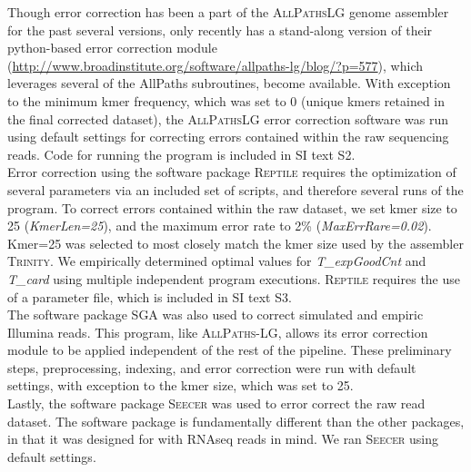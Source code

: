 \documentclass[11pt]{article}
\begin{document}
\noindent
Though error correction has been a part of the \textsc{AllPathsLG} genome assembler for the past several versions, only recently has a stand-along version of their python-based error correction module (\url{http://www.broadinstitute.org/software/allpaths-lg/blog/?p=577}), which leverages several of the AllPaths subroutines, become available.  With exception to the minimum kmer frequency, which was set to 0 (unique kmers retained in the final corrected dataset), the \textsc{AllPathsLG} error correction software was run using default settings for correcting errors contained within the raw sequencing reads.  Code for running the program is included in SI text S2.   \\

\noindent
Error correction using the software package \textsc{Reptile} requires the optimization of several parameters via an included set of scripts, and therefore several runs of the program. To correct errors contained within the raw dataset, we set kmer size to 25 (\textit{KmerLen=25}), and the maximum error rate to 2\% (\textit{MaxErrRare=0.02}). Kmer=25 was selected to most closely match the kmer size used by the assembler \textsc{Trinity}. We empirically determined optimal values for \textit{T\_expGoodCnt} and \textit{T\_card} using multiple independent program executions.  \textsc{Reptile} requires the use of a parameter file, which is included in SI text S3.   \\

\noindent
The software package \textsc{SGA} was also used to correct simulated and empiric Illumina reads. This program, like \textsc{AllPaths-LG}, allows its error correction module to be applied independent of the rest of the pipeline. These preliminary steps, preprocessing, indexing, and error correction were run with default settings, with exception to the kmer size, which was set to 25.  \\

\noindent
Lastly, the software package \textsc{Seecer} was used to error correct the raw read dataset.  The software package is fundamentally different than the other packages, in that it was designed for with RNAseq reads in mind. We ran \textsc{Seecer} using default settings.  \\
 
\end{document}

